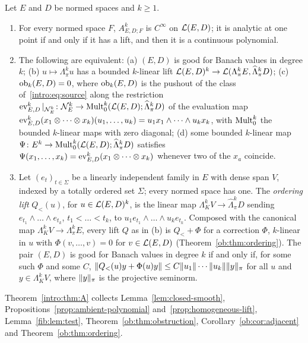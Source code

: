 \begin{introtheorem}\label{intro:thm:A}
Let $E$ and $D$ be normed spaces and $k\ge1$.
\begin{enumerate}
\item For every normed space $F$, $A^k_{E,D;F}$ is $C^\infty$ on $\mathcal L(E,D)$; it is analytic at one point if and only if
it has a lift, and then it is a continuous polynomial.
\item The following are equivalent: \textup{(a)} $(E,D)$ is good for Banach values in degree $k$; \textup{(b)}
$u\mapsto\Lambda^k_\pi u$ has a bounded $k$-linear lift $\mathcal L(E,D)^k\to\mathcal L(\Lambda^k_\pi E,\widehat\Lambda^k_\pi D)$;
\textup{(c)} $\operatorname{ob}_k(E,D)=0$, where $\operatorname{ob}_k(E,D)$ is the pushout of the class of~\eqref{intro:eq:source} along the
restriction $\operatorname{ev}^k_{E,D}|_{\mathcal N^k_E}\colon\mathcal N^k_E\to\operatorname{Mult}^k_0(\mathcal L(E,D);\widehat\Lambda^k_\pi D)$ of the evaluation map
$\operatorname{ev}^k_{E,D}(x_1\otimes\dots\otimes x_k)(u_1,\dots,u_k)=u_1x_1\wedge\dots\wedge u_kx_k$, with $\operatorname{Mult}^k_0$ the bounded
$k$-linear maps with zero diagonal; \textup{(d)} some bounded $k$-linear map
$\Psi\colon E^k\to\operatorname{Mult}^k_0(\mathcal L(E,D);\widehat\Lambda^k_\pi D)$ satisfies
$\Psi(x_1,\dots,x_k)=\operatorname{ev}^k_{E,D}(x_1\otimes\dots\otimes x_k)$ whenever two of the $x_a$ coincide.
\item Let $(e_t)_{t\in\Sigma}$ be a linearly independent family in $E$ with dense span $V$, indexed by a totally ordered
set $\Sigma$; every normed space has one. The \emph{ordering lift} $Q_<(u)$, for $u\in\mathcal L(E,D)^k$, is the linear map
$\Lambda^k_KV\to\widehat\Lambda^k_\pi D$ sending $e_{t_1}\wedge\dots\wedge e_{t_k}$, $t_1<\dots<t_k$, to
$u_1e_{t_1}\wedge\dots\wedge u_ke_{t_k}$. Composed with the canonical map $\Lambda^k_KV\to\Lambda^k_\pi E$, every lift
$Q$ as in \textup{(b)} is $Q_<+\Phi$ for a correction $\Phi$, $k$-linear in $u$ with $\Phi(v,\dots,v)=0$ for
$v\in\mathcal L(E,D)$ (Theorem~\ref{ob:thm:ordering}). The pair $(E,D)$ is good for Banach values in degree $k$ if and only
if, for some such $\Phi$ and some $C$, $\lVert Q_<(u)y+\Phi(u)y\rVert\le C\lVert u_1\rVert\cdots\lVert u_k\rVert\lVert y\rVert_\pi$ for all $u$
and $y\in\Lambda^k_KV$, where $\lVert y\rVert_\pi$ is the projective seminorm.
\end{enumerate}
\end{introtheorem}

Theorem~\ref{intro:thm:A} collects Lemma~\ref{lem:closed-smooth}, Propositions~\ref{prop:ambient-polynomial}
and~\ref{prop:homogeneous-lift}, Lemma~\ref{fib:lem:test}, Theorem~\ref{ob:thm:obstruction},
Corollary~\ref{ob:cor:adjacent} and Theorem~\ref{ob:thm:ordering}.


